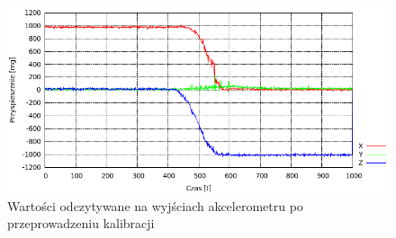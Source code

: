 \begin{figure}[h!]
 \centering
 \includegraphics[width=\textwidth]{../images/ch04/calib_acc_data.png}
 \caption{Wartości odczytywane na wyjściach akcelerometru po przeprowadzeniu kalibracji}
 \label{fig:MMADataCalib}
\end{figure}